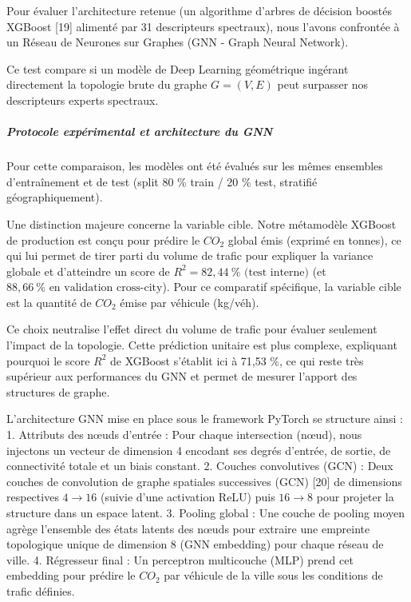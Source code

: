 \documentclass[10pt, a4paper]{article}
\begin{document}
Pour évaluer l'architecture retenue (un algorithme d'arbres de décision
boostés XGBoost {[}19{]} alimenté par 31 descripteurs spectraux), nous
l'avons confrontée à un Réseau de Neurones sur Graphes (GNN - Graph
Neural Network).

Ce test compare si un modèle de Deep Learning géométrique ingérant
directement la topologie brute du graphe \(G=(V, E)\) peut surpasser nos
descripteurs experts spectraux.

\subparagraph{Protocole expérimental et architecture du
GNN}\label{protocole-expuxe9rimental-et-architecture-du-gnn}

Pour cette comparaison, les modèles ont été évalués sur les mêmes
ensembles d'entraînement et de test (split 80 \% train / 20 \% test,
stratifié géographiquement).

Une distinction majeure concerne la variable cible. Notre métamodèle
XGBoost de production est conçu pour prédire le \(CO_2\) global émis
(exprimé en tonnes), ce qui lui permet de tirer parti du volume de
trafic pour expliquer la variance globale et d'atteindre un score de
\(R^2 = 82{,}44\ \% \text{ (test interne)}\) (et
\(88{,}66\ \% \text{ en validation cross-city}\)). Pour ce comparatif
spécifique, la variable cible est la quantité de \(CO_2\) émise par
véhicule (kg/véh).

Ce choix neutralise l'effet direct du volume de trafic pour évaluer
seulement l'impact de la topologie. Cette prédiction unitaire est plus
complexe, expliquant pourquoi le score \(R^2\) de XGBoost s'établit ici
à 71,53 \%, ce qui reste très supérieur aux performances du GNN et
permet de mesurer l'apport des structures de graphe.

L'architecture GNN mise en place sous le framework PyTorch se structure
ainsi : 1. Attributs des nœuds d'entrée : Pour chaque intersection
(nœud), nous injectons un vecteur de dimension 4 encodant ses degrés
d'entrée, de sortie, de connectivité totale et un biais constant. 2.
Couches convolutives (GCN) : Deux couches de convolution de graphe
spatiales successives (GCN) {[}20{]} de dimensions respectives
\(4 \rightarrow 16\) (suivie d'une activation ReLU) puis
\(16 \rightarrow 8\) pour projeter la structure dans un espace latent.
3. Pooling global : Une couche de pooling moyen agrège l'ensemble des
états latents des nœuds pour extraire une empreinte topologique unique
de dimension 8 (GNN embedding) pour chaque réseau de ville. 4.
Régresseur final : Un perceptron multicouche (MLP) prend cet embedding
pour prédire le \(CO_2\) par véhicule de la ville sous les conditions de
trafic définies.
\end{document}
